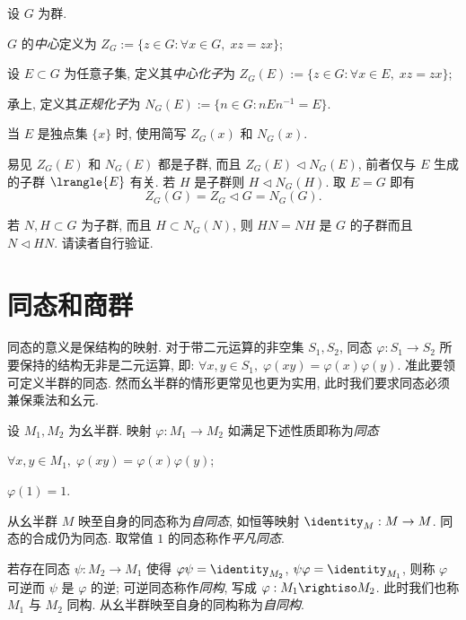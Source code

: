 \begin{definition}[中心, 中心化子与正规化子]
	设 $G$ 为群.
	\begin{compactenum}[(i)]
		\item $G$ 的\emph{中心}定义为 $Z_G := \{z \in G : \forall x \in G, \; xz=zx\}$;
		\item 设 $E \subset G$ 为任意子集, 定义其\emph{中心化子}为 $Z_G(E) := \{z \in G : \forall x \in E, \; xz=zx \}$;
		\item 承上, 定义其\emph{正规化子}为 $N_G(E) := \{n \in G : nEn^{-1} = E \}$.
	\end{compactenum}
	当 $E$ 是独点集 $\{x\}$ 时, 使用简写 $Z_G(x)$ 和 $N_G(x)$.
\end{definition}

易见 $Z_G(E)$ 和 $N_G(E)$ 都是子群, 而且 $Z_G(E) \lhd N_G(E)$, 前者仅与 $E$ 生成的子群 $\lrangle{E}$ 有关. 若 $H$ 是子群则 $H \lhd N_G(H)$. 取 $E=G$ 即有
\[ Z_G(G) = Z_G \lhd G = N_G(G). \]

\begin{remark}\label{rem:HN}
	若 $N, H \subset G$ 为子群, 而且 $H \subset N_G(N)$, 则 $HN = NH$ 是 $G$ 的子群而且 $N \lhd HN$. 请读者自行验证.
\end{remark}

\section{同态和商群}\label{sec:homomorphism}
同态的意义是保结构的映射. 对于带二元运算的非空集 $S_1, S_2$, 同态 $\varphi: S_1 \to S_2$ 所要保持的结构无非是二元运算, 即: $\forall x,y \in S_1, \; \varphi(xy)=\varphi(x)\varphi(y)$. 准此要领可定义半群的同态. 然而幺半群的情形更常见也更为实用, 此时我们要求同态必须兼保乘法和幺元.

\begin{definition}[同态与同构]
	设 $M_1, M_2$ 为幺半群. 映射 $\varphi: M_1 \to M_2$ 如满足下述性质即称为\emph{同态}
	\begin{compactenum}[(i)]
		\item $\forall x,y \in M_1, \; \varphi(xy) = \varphi(x) \varphi(y)$;
		\item $\varphi(1)=1$.
	\end{compactenum}
	从幺半群 $M$ 映至自身的同态称为\emph{自同态}, 如恒等映射 $\identity_M: M \to M$. 同态的合成仍为同态. 取常值 $1$ 的同态称作\emph{平凡同态}.

	若存在同态 $\psi: M_2 \to M_1$ 使得 $\varphi \psi = \identity_{M_2}$, $\psi \varphi = \identity_{M_1}$, 则称 $\varphi$ 可逆而 $\psi$ 是 $\varphi$ 的逆; 可逆同态称作\emph{同构}, 写成 $\varphi: M_1 \rightiso M_2$. 此时我们也称 $M_1$ 与 $M_2$ 同构. 从幺半群映至自身的同构称为\emph{自同构}.
\end{definition}

